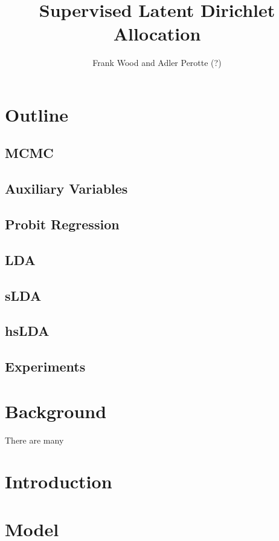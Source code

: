 \documentclass[11pt]{amsart}
\title{Supervised Latent Dirichlet Allocation}
\author{Frank Wood and Adler Perotte (?)}
\begin{document}
\maketitle

\section{Outline}
\subsection{MCMC}
\subsection{Auxiliary Variables}
\subsection{Probit Regression}

\subsection{LDA}
\subsection{sLDA}
\subsection{hsLDA}
\subsection{Experiments}


\section{Background}
There are many 

\section{Introduction}
\label{sec:introduction}


\section{Model}
\label{sec:model}

\end{document}
